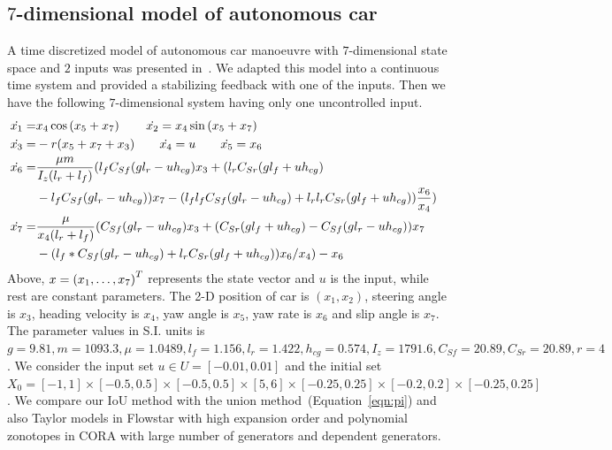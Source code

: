 \subsection{$7$-dimensional model of autonomous car}
A time discretized model of autonomous car manoeuvre with $7$-dimensional
state space and $2$ inputs was presented in~\cite{lavaei2020formal}.
We adapted this model into a continuous time system and provided a
stabilizing feedback with one of the inputs.  Then we have the
following $7$-dimensional system having only one
uncontrolled input.
%
\begin{align*}
\dot{x_1}  = & x_4\cos\rb{x_5+x_7}\hspace{2em} \dot{x_2} =
x_4\sin\rb{x_5+x_7}\\
%
\dot{x_3}  = & -r(x_5+x_7+x_3) \hspace{2em} \dot{x_4} =
 u \hspace{2em} \dot{x_5} = x_6 & \\
 \dot{x_6}  = & \frac{\mu
 m}{I_z(l_r+l_f)}(l_fC_{Sf}(gl_r-uh_{cg})x_3+
 (l_rC_{Sr}(gl_f+uh_{cg})\\& -l_fC_{Sf}(gl_r-uh_{cg}))x_7
 -(l_fl_fC_{Sf}(gl_r-uh_{cg}) + l_rl_rC_{Sr}(gl_f+uh_{cg}))\frac{x_6}{x_4})\\
%
\dot{x_7} 
= & \frac{\mu}{x_4(l_r+l_f)}(C_{Sf}(gl_r-uh_{cg})x_3+(C_{Sr}(gl_f+uh_{cg})-C_{Sf}(gl_r-uh_{cg}))x_7\\
&-(l_f*C_{Sf}(gl_r-uh_{cg}) + l_rC_{Sr}(gl_f+uh_{cg}))x_6/x_4)-x_6
\end{align*}
%
Above, $x = \left(x_1,\ldots,x_7\right)^T$ represents the state vector and $u$
is the input, while rest are constant parameters.  The 2-D position of
car is $(x_1,x_2)$, steering angle is $x_3$, heading velocity is
$x_4$, yaw angle is $x_5$, yaw rate is $x_6$ and slip angle is $x_7$.
The parameter values in S.I. units is 
%
$ g = 9.81, m = 1093.3, \mu = 1.0489, l_f = 1.156, l_r = 1.422, h_{cg}
  = 0.574, I_z = 1791.6, C_{Sf} = 20.89, C_{Sr} = 20.89, r = 4$.  We
  consider the input set $u\in U = [-0.01,0.01]$ and the initial set
  $X_0 =
  [-1,1]\times[-0.5,0.5]\times[-0.5,0.5]\times[5,6]\times[-0.25,0.25]\times[-0.2,0.2]\times[-0.25,0.25]$.
  We compare our IoU method with the union
  method~(Equation~\ref{eqn:pi}) and also Taylor models in Flowstar
  with high expansion order and polynomial zonotopes in CORA with
  large number of generators and dependent generators.


